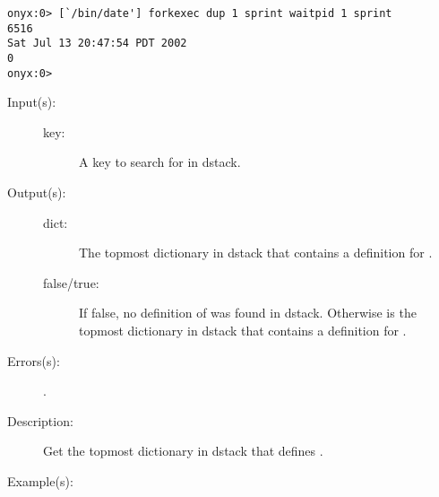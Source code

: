 \begin{description}
\begin{description}
\begin{verbatim}
onyx:0> [`/bin/date'] forkexec dup 1 sprint waitpid 1 sprint
6516
Sat Jul 13 20:47:54 PDT 2002
0
onyx:0>
		\end{verbatim}
	\end{description}
\label{systemdict:where}
\item[{\onyxop{key}{where}{false}}: ]
\item[{\onyxop{key}{where}{dict true}}: ]
	\begin{description}\item[]
	\item[Input(s): ]
		\begin{description}\item[]
		\item[key: ]
			A key to search for in dstack.
		\end{description}
	\item[Output(s): ]
		\begin{description}\item[]
		\item[dict: ]
			The topmost dictionary in dstack that contains a
			definition for .
		\item[false/true: ]
			If false, no definition of  was found in
			dstack.  Otherwise  is the topmost
			dictionary in dstack that contains a definition for
			.
		\end{description}
	\item[Errors(s): ]
		\begin{description}\item[]
		\item[.]
		\end{description}
	\item[Description: ]
		Get the topmost dictionary in dstack that defines .
	\item[Example(s): ]\begin{verbatim}


\end{verbatim}
\end{description}
\end{description}
